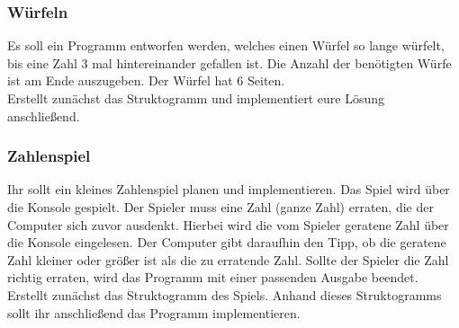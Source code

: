 \subsubsection{Würfeln}
Es soll ein Programm entworfen werden, welches einen Würfel so lange würfelt, bis eine Zahl 3 mal hintereinander gefallen ist. Die Anzahl der benötigten Würfe ist am Ende auszugeben. Der Würfel hat 6 Seiten. \\
Erstellt zunächst das Struktogramm und implementiert eure Lösung anschließend.


\subsubsection{Zahlenspiel}
Ihr sollt ein kleines Zahlenspiel planen und implementieren. Das Spiel wird über die Konsole gespielt. Der Spieler muss eine Zahl (ganze Zahl) erraten, die der Computer sich zuvor ausdenkt. Hierbei wird die vom Spieler geratene Zahl über die Konsole eingelesen. Der Computer gibt daraufhin den Tipp, ob die geratene Zahl kleiner oder größer ist als die zu erratende Zahl. Sollte der Spieler die Zahl richtig erraten, wird das Programm mit einer passenden Ausgabe beendet.\\
Erstellt zunächst das Struktogramm des Spiels. Anhand dieses Struktogramms sollt ihr anschließend das Programm implementieren.